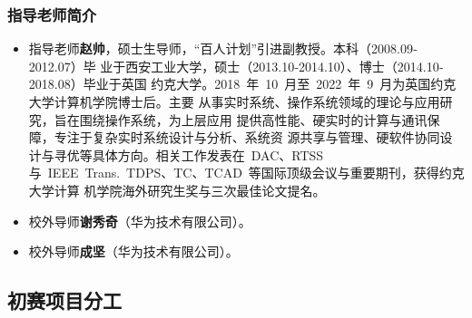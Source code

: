 \subsubsection{指导老师简介}
\begin{itemize}
\item 指导老师\textbf{赵帅}，硕士生导师，“百人计划”引进副教授。本科（2008.09‐2012.07）毕
业于西安工业大学，硕士（2013.10‐2014.10）、博士（2014.10‐2018.08）毕业于英国
约克大学。2018 年 10 月至 2022 年 9 月为英国约克大学计算机学院博士后。主要
从事实时系统、操作系统领域的理论与应用研究，旨在围绕操作系统，为上层应用
提供高性能、硬实时的计算与通讯保障，专注于复杂实时系统设计与分析、系统资
源共享与管理、硬软件协同设计与寻优等具体方向。相关工作发表在 DAC、RTSS
与 IEEE Trans. TDPS、TC、TCAD 等国际顶级会议与重要期刊，获得约克大学计算
机学院海外研究生奖与三次最佳论文提名。

\item 校外导师\textbf{谢秀奇}（华为技术有限公司）。
\item  校外导师\textbf{成坚}（华为技术有限公司）。
\end{itemize}


\subsection{初赛项目分工}

